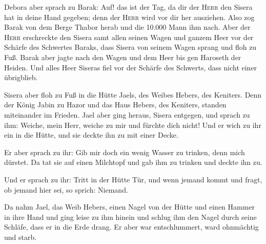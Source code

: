  Debora aber sprach zu Barak: Auf! das ist der Tag, da
dir der \textsc{Herr} den Sisera hat in deine Hand gegeben; denn der
\textsc{Herr} wird vor dir her ausziehen. Also zog Barak von dem Berge
Thabor herab und die 10.000 Mann ihm nach.  Aber der
\textsc{Herr} erschreckte den Sisera samt allen seinen Wagen und ganzem
Heer vor der Schärfe des Schwertes Baraks, dass Sisera von seinem Wagen
sprang und floh zu Fuß.  Barak aber jagte nach den Wagen
und dem Heer bis gen Haroseth der Heiden. Und alles Heer Siseras fiel
vor der Schärfe des Schwerts, dass nicht einer übrigblieb.

 Sisera aber floh zu Fuß in die Hütte Jaels, des Weibes
Hebers, des Keniters. Denn der König Jabin zu Hazor und das Haus Hebers,
des Keniters, standen miteinander im Frieden.  Jael aber
ging heraus, Sisera entgegen, und sprach zu ihm: Weiche, mein Herr,
weiche zu mir und fürchte dich nicht! Und er wich zu ihr ein in die
Hütte, und sie deckte ihn zu mit einer Decke.

 Er aber sprach zu ihr: Gib mir doch ein wenig Wasser zu
trinken, denn mich dürstet. Da tat sie auf einen Milchtopf und gab ihm
zu trinken und deckte ihn zu.

 Und er sprach zu ihr: Tritt in der Hütte Tür, und wenn
jemand kommt und fragt, ob jemand hier sei, so sprich: Niemand.

 Da nahm Jael, das Weib Hebers, einen Nagel von der Hütte
und einen Hammer in ihre Hand und ging leise zu ihm hinein und schlug
ihm den Nagel durch seine Schläfe, dass er in die Erde drang. Er aber
war entschlummert, ward ohnmächtig und starb.

